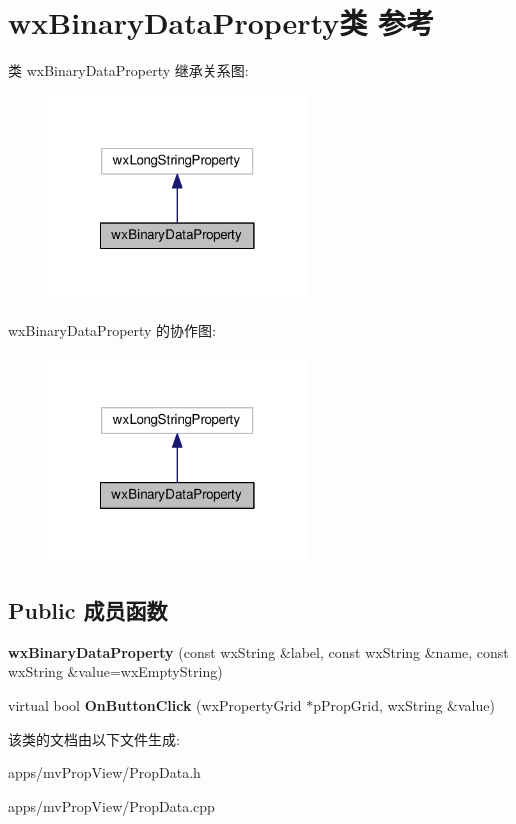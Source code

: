 \hypertarget{classwx_binary_data_property}{\section{wx\+Binary\+Data\+Property类 参考}
\label{classwx_binary_data_property}
}


类 wx\+Binary\+Data\+Property 继承关系图\+:
\nopagebreak
\begin{figure}[H]
\begin{center}
\leavevmode
\includegraphics[width=194pt]{classwx_binary_data_property__inherit__graph}
\end{center}
\end{figure}


wx\+Binary\+Data\+Property 的协作图\+:
\nopagebreak
\begin{figure}[H]
\begin{center}
\leavevmode
\includegraphics[width=194pt]{classwx_binary_data_property__coll__graph}
\end{center}
\end{figure}
\subsection*{Public 成员函数}
\begin{DoxyCompactItemize}
\item 
\hypertarget{classwx_binary_data_property_a25c2bc3eeed6f3a8d00a1f7fc3b6500b}{{\bfseries wx\+Binary\+Data\+Property} (const wx\+String \&label, const wx\+String \&name, const wx\+String \&value=wx\+Empty\+String)}\label{classwx_binary_data_property_a25c2bc3eeed6f3a8d00a1f7fc3b6500b}

\item 
\hypertarget{classwx_binary_data_property_aa35e739c64b930e79714a15f19f3fcfa}{virtual bool {\bfseries On\+Button\+Click} (wx\+Property\+Grid $\ast$p\+Prop\+Grid, wx\+String \&value)}\label{classwx_binary_data_property_aa35e739c64b930e79714a15f19f3fcfa}

\end{DoxyCompactItemize}


该类的文档由以下文件生成\+:\begin{DoxyCompactItemize}
\item 
apps/mv\+Prop\+View/Prop\+Data.\+h\item 
apps/mv\+Prop\+View/Prop\+Data.\+cpp\end{DoxyCompactItemize}
